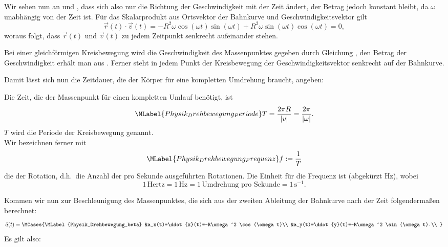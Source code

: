 \begin{MContent}
        Wir sehen nun an  und , dass sich also nur die Richtung der Geschwindigkeit mit der Zeit \"andert, der Betrag jedoch konstant bleibt, da $\omega$ unabh\"angig von der Zeit ist. F\"ur das Skalarprodukt aus Ortsvektor der Bahnkurve und Geschwindigkeitsvektor gilt
        $$
        \vec{r}(t)\cdot\vec{v}(t)=-R^2\omega\cos(\omega t)\sin(\omega t)+ R^2\omega\sin(\omega t)\cos(\omega t)=0,
        $$ 
        woraus folgt, dass $\vec{r}(t)$ und $\vec{v}(t)$ zu jedem Zeitpunkt senkrecht aufeinander stehen.
        \begin{MInfo}
        Bei einer gleichf\"ormigen Kreisbewegung wird die Geschwindigkeit des Massenpunktes gegeben durch Gleichung , den Betrag der Geschwindigkeit erh\"alt man aus . Ferner steht in jedem Punkt der Kreisbewegung der Geschwindigkeitsvektor senkrecht auf der Bahnkurve.
        \end{MInfo}
        
        Damit l\"asst sich nun die Zeitdauer, die der K\"orper f\"ur eine kompletten Umdrehung braucht, angeben:
          \begin{MInfo}
          Die Zeit, die der Massenpunkt f\"ur einen kompletten Umlauf ben\"otigt, ist
          \begin{equation}\MLabel{Physik_Drehbewegung_Periode}
          T=\frac{2\pi R}{\vert v\vert}=\frac{2\pi}{\vert\omega\vert}.
          \end{equation} $T$ wird die Periode der Kreisbewegung genannt.\\
          Wir bezeichnen ferner mit
          \begin{equation}\MLabel{Physik_Drehbewegung_Frequenz}
          f:=\frac{1}{T}
          \end{equation} die  der Rotation, d.h.~die Anzahl der pro Sekunde ausgef\"uhrten Rotationen. Die Einheit f\"ur die Frequenz ist  (abgek\"urzt Hz), wobei 
          $$
          1\,\text{Hertz}=1\,\text{Hz}=1\,\text{Umdrehung pro Sekunde}=1\,\text{s}^{-1}.
          $$
          \end{MInfo}
          
          
         Kommen wir nun zur Beschleunigung des Massenpunktes, die sich aus der zweiten Ableitung der Bahnkurve nach der Zeit folgenderma{\ss}en berechnet:
             \begin{equation}
             \vec{a}(t)=\MCases{\MLabel{Physik_Drehbewegung_beta}
                 &a_x(t)=\ddot{x}(t)=-R\omega^2 \cos(\omega t)\\
                 &a_y(t)=\ddot{y}(t)=-R\omega^2 \sin(\omega t).\\
                 }
             \end{equation}
             Es gilt also:
             

\end{MContent}
